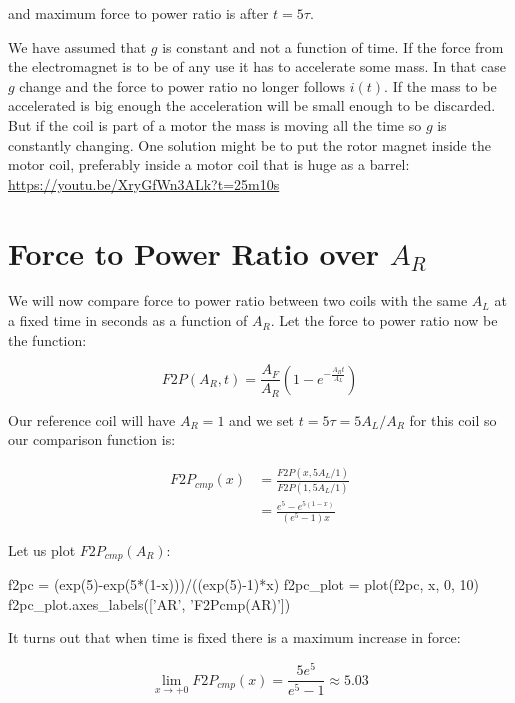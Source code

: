 \documentclass[]{../common/elementary-physics}
\begin{document}
and maximum force to power ratio is after $t = 5 \tau$.

We have assumed that $g$ is constant and not a function of time.
If the force from the electromagnet is to be of any use it has to accelerate some mass.
In that case $g$ change and the force to power ratio no longer follows $i(t)$.
If the mass to be accelerated is big enough the acceleration will be small enough to be discarded.
But if the coil is part of a motor the mass is moving all the time so $g$ is constantly changing.
One solution might be to put the rotor magnet inside the motor coil, preferably inside a motor coil that is huge as a barrel\cite{jonew}: \url{https://youtu.be/XryGfWn3ALk?t=25m10s}

\section{Force to Power Ratio over $A_R$}

We will now compare force to power ratio between two coils with the same $A_L$ at a fixed time in seconds as a function of $A_R$. Let the force to power ratio now be the function:

\begin{equation}
F2P(A_R,t) = \frac{A_F}{A_R} (1 - e^{- \frac{A_R t}{A_L}})
\end{equation}

Our reference coil will have $A_R = 1$ and we set $t = 5 \tau = 5 A_L/A_R$ for this coil so our comparison function is:

\begin{subequations}
\begin{align}
F2P_{cmp}(x) &= \frac{F2P(x,5 A_L/1)}{F2P(1,5 A_L/1)} \\
&= \frac{e^5-e^{5(1-x)}}{(e^5-1)x}
\end{align}
\end{subequations}

Let us plot $F2P_{cmp}(A_R)$:

\begin{sagesilent}
f2pc = (exp(5)-exp(5*(1-x)))/((exp(5)-1)*x)
f2pc_plot = plot(f2pc, x, 0, 10)
f2pc_plot.axes_labels(['AR', 'F2Pcmp(AR)'])
\end{sagesilent}


It turns out that when time is fixed there is a maximum increase in force:

\begin{equation}
\lim_{x \to +0} F2P_{cmp}(x) = \frac{5 e^5}{e^5-1} \approx 5.03
\end{equation}
\end{document}
